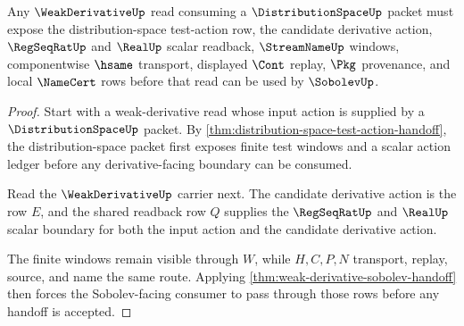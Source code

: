 \begin{theorem}
\label{thm:weak-derivative-distribution-space-boundary}
Any $\WeakDerivativeUp$ read consuming a $\DistributionSpaceUp$ packet must expose the distribution-space test-action row, the candidate derivative action, $\RegSeqRatUp$ and $\RealUp$ scalar readback, $\StreamNameUp$ windows, componentwise $\hsame$ transport, displayed $\Cont$ replay, $\Pkg$ provenance, and local $\NameCert$ rows before that read can be used by $\SobolevUp$.
\end{theorem}
\begin{proof}
Start with a weak-derivative read whose input action is supplied by a $\DistributionSpaceUp$ packet. By \autoref{thm:distribution-space-test-action-handoff}, the distribution-space packet first exposes finite test windows and a scalar action ledger before any derivative-facing boundary can be consumed.

Read the $\WeakDerivativeUp$ carrier next. The candidate derivative action is the row $E$, and the shared readback row $Q$ supplies the $\RegSeqRatUp$ and $\RealUp$ scalar boundary for both the input action and the candidate derivative action.

The finite windows remain visible through $W$, while $H,C,P,N$ transport, replay, source, and name the same route. Applying \autoref{thm:weak-derivative-sobolev-handoff} then forces the Sobolev-facing consumer to pass through those rows before any handoff is accepted.
\end{proof}




